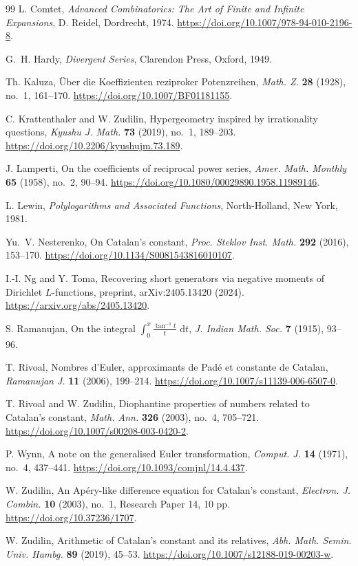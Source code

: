 \documentclass[11pt,reqno]{amsart}
\numberwithin{equation}{section}
\theoremstyle{definition}
\theoremstyle{remark}
\newcommand{\dd}{\,\mathrm{d}}
\begin{document}
\begin{thebibliography}{99}
L. Comtet,
\emph{Advanced Combinatorics: The Art of Finite and Infinite Expansions},
D. Reidel, Dordrecht, 1974.
\url{https://doi.org/10.1007/978-94-010-2196-8}.

G.~H. Hardy,
\emph{Divergent Series},
Clarendon Press, Oxford, 1949.

Th. Kaluza,
\"Uber die Koeffizienten reziproker Potenzreihen,
\emph{Math. Z.} \textbf{28} (1928), no.~1, 161--170.
\url{https://doi.org/10.1007/BF01181155}.

C. Krattenthaler and W. Zudilin,
Hypergeometry inspired by irrationality questions,
\emph{Kyushu J. Math.} \textbf{73} (2019), no.~1, 189--203.
\url{https://doi.org/10.2206/kyushujm.73.189}.

J. Lamperti,
On the coefficients of reciprocal power series,
\emph{Amer. Math. Monthly} \textbf{65} (1958), no.~2, 90--94.
\url{https://doi.org/10.1080/00029890.1958.11989146}.

L. Lewin,
\emph{Polylogarithms and Associated Functions},
North-Holland, New York, 1981.

Yu.~V. Nesterenko,
On Catalan's constant,
\emph{Proc. Steklov Inst. Math.} \textbf{292} (2016), 153--170.
\url{https://doi.org/10.1134/S0081543816010107}.

I.-I. Ng and Y. Toma,
Recovering short generators via negative moments of Dirichlet
\(L\)-functions,
preprint, arXiv:2405.13420 (2024).
\url{https://arxiv.org/abs/2405.13420}.

S. Ramanujan,
On the integral
\(\int_0^x \frac{\tan^{-1}t}{t}\,\dd t\),
\emph{J. Indian Math. Soc.} \textbf{7} (1915), 93--96.

T. Rivoal,
Nombres d'Euler, approximants de Pad\'e et constante de Catalan,
\emph{Ramanujan J.} \textbf{11} (2006), 199--214.
\url{https://doi.org/10.1007/s11139-006-6507-0}.

T. Rivoal and W. Zudilin,
Diophantine properties of numbers related to Catalan's constant,
\emph{Math. Ann.} \textbf{326} (2003), no.~4, 705--721.
\url{https://doi.org/10.1007/s00208-003-0420-2}.

P. Wynn,
A note on the generalised Euler transformation,
\emph{Comput. J.} \textbf{14} (1971), no.~4, 437--441.
\url{https://doi.org/10.1093/comjnl/14.4.437}.

W. Zudilin,
An Ap\'ery-like difference equation for Catalan's constant,
\emph{Electron. J. Combin.} \textbf{10} (2003), no.~1,
Research Paper 14, 10 pp.
\url{https://doi.org/10.37236/1707}.

W. Zudilin,
Arithmetic of Catalan's constant and its relatives,
\emph{Abh. Math. Semin. Univ. Hambg.} \textbf{89} (2019), 45--53.
\url{https://doi.org/10.1007/s12188-019-00203-w}.

\end{thebibliography}
\end{document}

